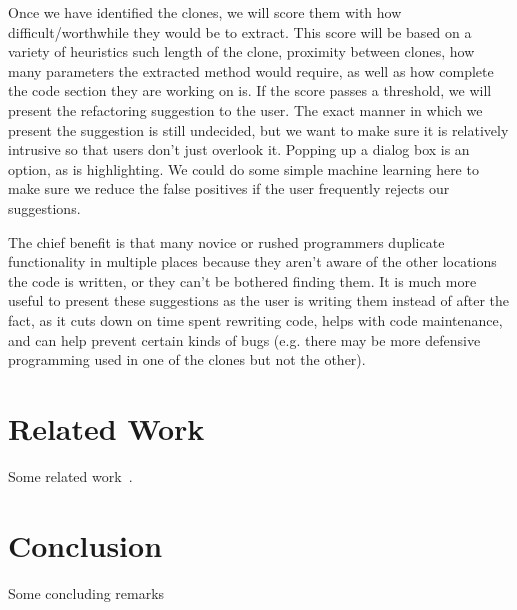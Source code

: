 \documentclass[preprint,10pt]{sigplanconf}
\begin{document}
Once we have identified the clones, we will score them with how difficult/worthwhile they would be to extract. This score will be based on a variety of heuristics such length of the clone, proximity between clones, how many parameters the extracted method would require, as well as how complete the code section they are working on is. If the score passes a threshold, we will present the refactoring suggestion to the user. The exact manner in which we present the suggestion is still undecided, but we want to make sure it is relatively intrusive so that users don't just overlook it. Popping up a dialog box is an option, as is highlighting. We could do some simple machine learning here to make sure we reduce the false positives if the user frequently rejects our suggestions.

The chief benefit is that many novice or rushed programmers duplicate functionality in multiple places because they aren't aware of the other locations the code is written, or they can't be bothered finding them. It is much more useful to present these suggestions as the user is writing them instead of after the fact, as it cuts down on time spent rewriting code, helps with code maintenance, and can help prevent certain kinds of bugs (e.g. there may be more defensive programming used in one of the clones but not the other).

\section{Related Work}
\label{sec:related}

Some related work~\cite{Roy2009}.

\section{Conclusion}

Some concluding remarks

%

%
%
\end{document}
